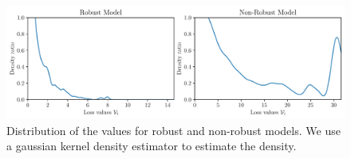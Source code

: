 
\begin{figure}[H]
\centering
    \includegraphics[width=\textwidth]{Figures/density_ratio.pdf}
    \caption{Distribution of the values for robust and non-robust models. We use a gaussian kernel density estimator to estimate the density.}
\label{fig:distrib_values}
\end{figure}

